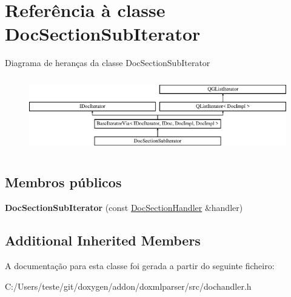 \hypertarget{class_doc_section_sub_iterator}{\section{Referência à classe Doc\-Section\-Sub\-Iterator}
\label{class_doc_section_sub_iterator}
}
Diagrama de heranças da classe Doc\-Section\-Sub\-Iterator\begin{figure}[H]
\begin{center}
\leavevmode
\includegraphics[height=3.294118cm]{class_doc_section_sub_iterator}
\end{center}
\end{figure}
\subsection*{Membros públicos}
\begin{DoxyCompactItemize}
\item 
\hypertarget{class_doc_section_sub_iterator_ade50911bbc633eedcc3005727d8699f9}{{\bfseries Doc\-Section\-Sub\-Iterator} (const \hyperlink{class_doc_section_handler}{Doc\-Section\-Handler} \&handler)}\label{class_doc_section_sub_iterator_ade50911bbc633eedcc3005727d8699f9}

\end{DoxyCompactItemize}
\subsection*{Additional Inherited Members}


A documentação para esta classe foi gerada a partir do seguinte ficheiro\-:\begin{DoxyCompactItemize}
\item 
C\-:/\-Users/teste/git/doxygen/addon/doxmlparser/src/dochandler.\-h\end{DoxyCompactItemize}
